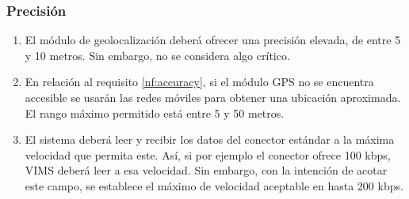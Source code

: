 \subsubsection{Precisión}
\begin{enumerate}[label=\textbf{\texttt{RNF-\arabic*}}]
  \item\label{nf:accuracy} El módulo de geolocalización deberá ofrecer una precisión elevada,
        de entre 5 y 10 metros. Sin embargo, no se considera algo crítico.
  \item\label{nf:net-acc} En relación al requisito \ref{nf:accuracy}, si el 
        módulo \ac{GPS} no se encuentra accesible se usarán las redes móviles para
        obtener una ubicación aproximada. El rango máximo permitido está
        entre 5 y 50 metros.
  \item\label{nf:read-speed} El sistema deberá leer y recibir los datos del
        conector estándar a la máxima velocidad que permita este. Así, si por
        ejemplo el conector ofrece 100 kbps, \ac{VIMS} deberá leer a esa velocidad.
        Sin embargo, con la intención de acotar este campo, se establece el máximo
        de velocidad aceptable en hasta 200 kbps.
\end{enumerate}